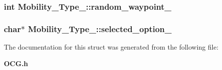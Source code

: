 \subsubsection[{random\_\-waypoint\_\-}]{\setlength{\rightskip}{0pt plus 5cm}int {\bf Mobility\_\-Type\_\-::random\_\-waypoint\_\-}}\label{structMobility__Type___e9a6e5921929252f0027443df8ec852c}


\subsubsection[{selected\_\-option\_\-}]{\setlength{\rightskip}{0pt plus 5cm}char$\ast$ {\bf Mobility\_\-Type\_\-::selected\_\-option\_\-}}\label{structMobility__Type___e7367c1ed8ccadce0efa2998ae0ac0ae}




The documentation for this struct was generated from the following file:\begin{CompactItemize}
\item 
{\bf OCG.h}\end{CompactItemize}
